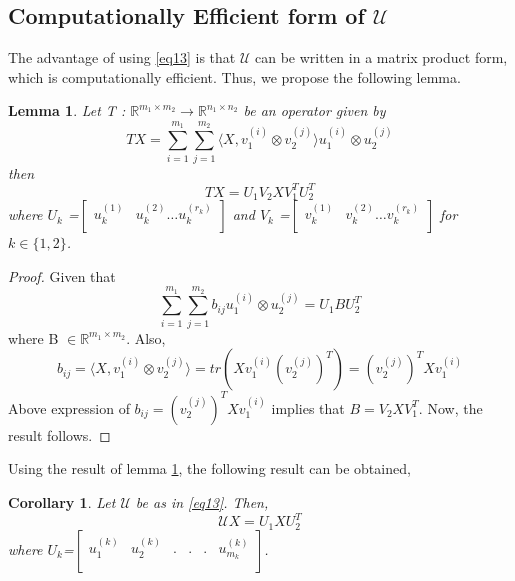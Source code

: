 \documentclass{article}
\newtheorem{lemma}{Lemma}
\newtheorem{corollary}{Corollary}
\begin{document}
\subsection{Computationally Efficient form of $\mathcal{U}$}\label{subsec:CEoFU}
The advantage of using \eqref{eq13} is that $\mathcal{U}$ can be written in a matrix product form, which is computationally efficient. Thus, we propose the following lemma.
\begin{lemma}\label{thm:4.2}
Let T : $\mathbb{R}^{m_1 \times m_2} \rightarrow \mathbb{R}^{n_1 \times n_2}$ be an operator given by
\begin{equation*} 
TX=\sum_{i=1}^{m_1}\sum_{j=1}^{m_2} \langle X, v_1^{(i)} \otimes v_2^{(j)}\rangle u_1^{(i)} \otimes u_2^{(j)}
\end{equation*}
then
\begin{equation*} 
TX=U_1V_2XV_1^TU_2^T
\end{equation*}
where $U_k$ =$\begin{bmatrix}
u_k^{(1)} & u_k^{(2)}  \dots u_{k}^{(r_k)}\\
\end{bmatrix} $ and $V_k$ =$\begin{bmatrix}
v_k^{(1)} & v_k^{(2)} \dots v_{k}^{(r_k)}\\
\end{bmatrix} $ for $k \in \{1,2\}$.
\end{lemma}
\begin{proof}
  Given that
   \begin{displaymath}
    \sum_{i=1}^{m_1}\sum_{j=1}^{m_2} b_{ij} u_1^{(i)} \otimes u_2^{(j)} = U_1BU_2^T
  \end{displaymath}
  where B $\in \mathbb{R}^{m_1 \times m_2}$. Also,
\begin{displaymath}
   b_{ij}=\langle X, v_1^{(i)} \otimes v_2^{(j)}\rangle =tr(Xv_1^{(i)}(v_2^{(j)})^T)=(v_2^{(j)})^TXv_1^{(i)}
 \end{displaymath}
 Above expression of $b_{ij}=(v_2^{(j)})^TXv_1^{(i)}$ implies that $B=V_2XV_1^T$.
Now, the result follows.
\end{proof}

Using the result of lemma \ref{thm:4.2}, the following result can be obtained,
\begin{corollary} \label{thm:thm1}
    Let $\mathcal{U}$ be as in \eqref{eq13}. Then,
  \begin{equation}\label{eq321}
      \mathcal{U}X=U_1XU_2^T
  \end{equation}
    where $U_k$=$\begin{bmatrix}
                    u_{1}^{(k)} & u_{2}^{(k)}  & .&.&.&u_{m_k}^{(k)}\\
                \end{bmatrix}$.\\
\end{corollary}
\end{document}
